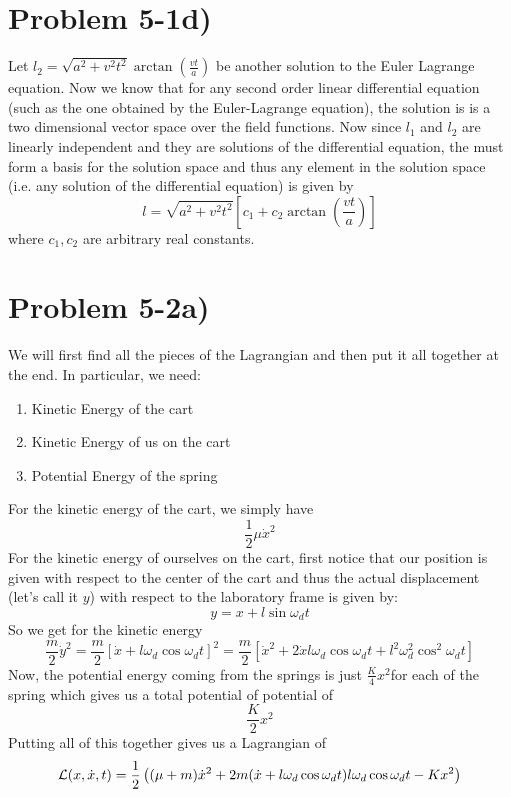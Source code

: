 \section*{Problem 5-1d)}
Let $l_2 = \sqrt{a^2+v^2t^2}\arctan\left(\frac{vt}{a}\right)$ be another solution to the Euler Lagrange equation. Now we know that for any second order linear differential equation (such as the one obtained by the Euler-Lagrange equation), the solution is is a two dimensional vector space over the field functions. Now since $l_1$ and $l_2$ are linearly independent and they are solutions of the differential equation, the must form a basis for the solution space and thus any element in the solution space (i.e. any solution of the differential equation) is given by
\[ l = \sqrt{a^2+v^2t^2}\left[c_1 + c_2 \arctan\left(\frac{vt}{a}\right)\right] \]
where $c_1, c_2$ are arbitrary real constants. 
\section*{Problem 5-2a)}
We will first find all the pieces of the Lagrangian and then put it all together at the end. In particular, we need:
\begin{enumerate}
\item Kinetic Energy of the cart
\item Kinetic Energy of us on the cart
\item Potential Energy of the spring
\end{enumerate}
For the kinetic energy of the cart, we simply have
\[ \frac{1}{2} \mu \dot{x}^2 \]
For the kinetic energy of ourselves on the cart, first notice that our position is given with respect to the center of the cart and thus the actual displacement (let's call it $y$) with respect to the laboratory frame is given by:
\[ y = x+l\sin\omega_d t \]
So we get for the kinetic energy
\[  \frac{m}{2}\dot{y}^2 = \frac{m}{2}\left[\dot{x} + l\omega_d\cos \omega_d t\right]^2  = \frac{m}{2}\left[\dot{x}^2 + 2\dot{x}l\omega_d\cos \omega_d t +  l^2\omega_d^2\cos^2 \omega_d t \right]  \]
Now, the potential energy coming from the springs is just $\frac{K}{4}x^2$for each of the spring which gives us a total potential of potential of 
\[ \frac{K}{2}x^2 \]
Putting all of this together gives us a Lagrangian of 
\[ \mathcal{L}(x,\dot{x},t)  = \frac{1}{2}\left((\mu+m) \dot{x}^2+ 2m(\dot{x} + l\omega_d\cos\omega_d t) l\omega_d\cos\omega_d t
 - Kx^2\right) \]
